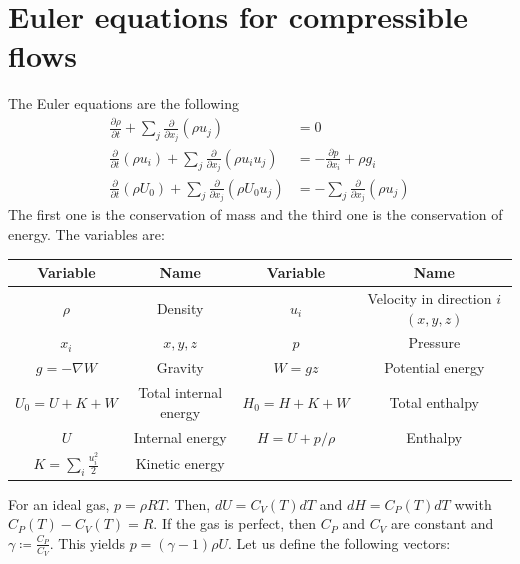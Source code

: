 \documentclass[12pt, openany]{report}
\theoremstyle{definition}
\begin{document}
\chapter{Euler equations for compressible flows}
The Euler equations are the following
\begin{equation}
	\begin{aligned}
		\frac{\partial \rho}{\partial t} + \sum_j \frac{\partial}{\partial x_j}(\rho u_j) &= 0\\
		\frac{\partial }{\partial t}(\rho u_i) + \sum_j \frac{\partial}{\partial x_j} (\rho u_i u_j)&=-\frac{\partial p}{\partial x_i} + \rho g_i\\
		\frac{\partial}{\partial t}(\rho U_0) + \sum_j \frac{\partial }{\partial x_j}(\rho U_0u_j) &= -\sum_j \frac{\partial }{\partial x_j}(\rho u_j)
	\end{aligned}
\end{equation}
The first one is the conservation of mass and the third one is the conservation of energy. The variables are:\\
\begin{center}
	\begin{tabular}{|c|c||c|c|}
		\hline 
		Variable & Name & Variable & Name\\ \hline \hline 
		$\rho$ & Density & $u_i$ & Velocity in direction $i$ $(x,y,z)$\\ \hline 
		$x_i$ & $x,y,z$ & $p$ & Pressure\\ \hline 
		$g=-\nabla W$ & Gravity & $W=gz$ & Potential energy \\\hline
		$U_0=U+K+W$& Total internal energy & $H_0=H+K+W$ & Total enthalpy\\ \hline
		$U$ & Internal energy & $H=U+p/\rho$ & Enthalpy\\ \hline 
		$K=\sum_i \frac{u_i^2}{2}$ & Kinetic energy & &\\ \hline 
	\end{tabular}
\end{center}
For an ideal gas, $p=\rho RT$. Then, $dU=C_V(T)dT$ and $dH = C_P(T)dT$ wwith $C_P(T)-C_V(T)=R$. If the gas is perfect, then $C_P$ and $C_V$ are constant and $\gamma\coloneqq\frac{C_P}{C_V}$. This yields $p=(\gamma-1)\rho U$.
Let us define the following vectors: 
\end{document}
